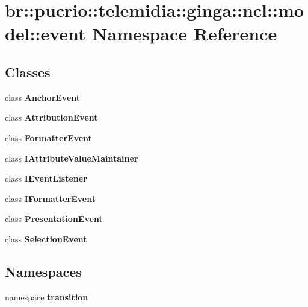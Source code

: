 \section{br::pucrio::telemidia::ginga::ncl::model::event Namespace Reference}
\label{namespacebr_1_1pucrio_1_1telemidia_1_1ginga_1_1ncl_1_1model_1_1event}


\subsection*{Classes}
\begin{CompactItemize}
\item 
class {\bf AnchorEvent}
\item 
class {\bf AttributionEvent}
\item 
class {\bf FormatterEvent}
\item 
class {\bf IAttributeValueMaintainer}
\item 
class {\bf IEventListener}
\item 
class {\bf IFormatterEvent}
\item 
class {\bf PresentationEvent}
\item 
class {\bf SelectionEvent}
\end{CompactItemize}
\subsection*{Namespaces}
\begin{CompactItemize}
\item 
namespace {\bf transition}
\end{CompactItemize}
